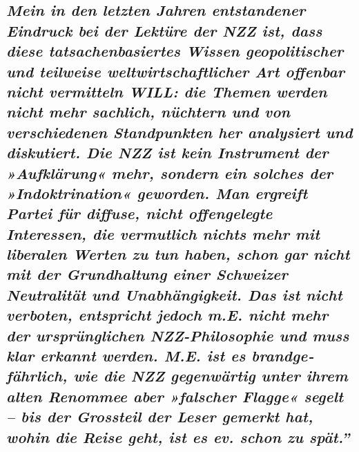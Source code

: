 {\subsection{\texorpdfstring{\emph{Mein in den letzten Jahren
entstandener Eindruck bei der Lektüre der NZZ ist, dass diese
tat­sachen­ba­siertes Wissen geo­poli­tischer und teil­weise
weltwirtschaftlicher Art offenbar nicht vermitteln WILL: die Themen
werden nicht mehr sachlich, nüchtern und von verschiedenen Stand­punkten
her analy­siert und diskutiert. Die NZZ ist kein Instrument der
»Aufklärung« mehr, sondern ein solches der »Indoktrination« geworden.
Man ergreift Partei für diffuse, nicht offen­ge­legte Interessen, die
vermutlich nichts mehr mit liberalen Werten zu tun haben, schon gar
nicht mit der Grund­haltung einer Schweizer Neutralität und
Unabhängig­keit. Das ist nicht verboten, entspricht jedoch m.E. nicht
mehr der ursprünglichen NZZ-Philosophie und muss klar erkannt werden.
M.E. ist es brand­ge­fährlich, wie die NZZ gegenwärtig unter ihrem alten
Renommee aber »falscher Flagge« segelt -- bis der Grossteil der Leser
gemerkt hat, wohin die Reise geht, ist es ev. schon zu
spät.''}}{Mein in den letzten Jahren entstandener Eindruck bei der Lektüre der NZZ ist, dass diese tat­sachen­ba­siertes Wissen geo­poli­tischer und teil­weise weltwirtschaftlicher Art offenbar nicht vermitteln WILL: die Themen werden nicht mehr sachlich, nüchtern und von verschiedenen Stand­punkten her analy­siert und diskutiert. Die NZZ ist kein Instrument der »Aufklärung« mehr, sondern ein solches der »Indoktrination« geworden. Man ergreift Partei für diffuse, nicht offen­ge­legte Interessen, die vermutlich nichts mehr mit liberalen Werten zu tun haben, schon gar nicht mit der Grund­haltung einer Schweizer Neutralität und Unabhängig­keit. Das ist nicht verboten, entspricht jedoch m.E. nicht mehr der ursprünglichen NZZ-Philosophie und muss klar erkannt werden. M.E. ist es brand­ge­fährlich, wie die NZZ gegenwärtig unter ihrem alten Renommee aber »falscher Flagge« segelt -- bis der Grossteil der Leser gemerkt hat, wohin die Reise geht, ist es ev. schon zu spät.''}}\label{mein-in-den-letzten-jahren-entstandener-eindruck-bei-der-lektuxfcre-der-nzz-ist-dass-diese-tatsachenbasiertes-wissen-geopolitischer-und-teilweise-weltwirtschaftlicher-art-offenbar-nicht-vermitteln-will-die-themen-werden-nicht-mehr-sachlich-nuxfcchtern-und-von-verschiedenen-standpunkten-her-analysiert-und-diskutiert-die-nzz-ist-kein-instrument-der-aufkluxe4rung-mehr-sondern-ein-solches-der-indoktrination-geworden-man-ergreift-partei-fuxfcr-diffuse-nicht-offengelegte-interessen-die-vermutlich-nichts-mehr-mit-liberalen-werten-zu-tun-haben-schon-gar-nicht-mit-der-grundhaltung-einer-schweizer-neutralituxe4t-und-unabhuxe4ngigkeit-das-ist-nicht-verboten-entspricht-jedoch-me-nicht-mehr-der-urspruxfcnglichen-nzz-philosophie-und-muss-klar-erkannt-werden-me-ist-es-brandgefuxe4hrlich-wie-die-nzz-gegenwuxe4rtig-unter-ihrem-alten-renommee-aber-falscher-flagge-segelt--bis-der-grossteil-der-leser-gemerkt-hat-wohin-die-reise-geht-ist-es-ev-schon-zu-spuxe4t}}

